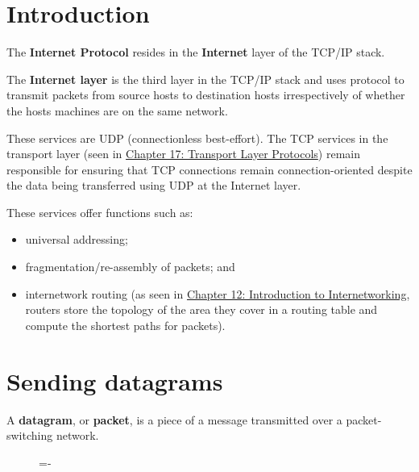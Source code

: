 \documentclass[a4paper]{systems-software}
\begin{document}
\section{Introduction}

The \textbf{Internet Protocol} resides in the \textbf{Internet} layer of the TCP/IP stack.

The \textbf{Internet layer} is the third layer in the TCP/IP stack and uses protocol to transmit packets from source hosts to destination hosts irrespectively of whether the hosts machines are on the same network.

These services are UDP (connectionless best-effort). The TCP services in the transport layer (seen in \hyperref[chap:17]{Chapter 17: Transport Layer Protocols}) remain responsible for ensuring that TCP connections remain connection-oriented despite the data being transferred using UDP at the Internet layer.

These services offer functions such as:
\begin{itemize}
	\item universal addressing;
	\item fragmentation/re-assembly of packets; and
	\item internetwork routing (as seen in \hyperref[chap:17]{Chapter 12: Introduction to Internetworking}, routers store the topology of the area they cover in a routing table and compute the shortest paths for packets).
\end{itemize}


\newpage

\section{Sending datagrams}

A \textbf{datagram}, or \textbf{packet}, is a piece of a message transmitted over a packet-switching network.

\begin{figure}[H]
	\lineskip=-\fboxrule
\end{figure}
\end{document}
